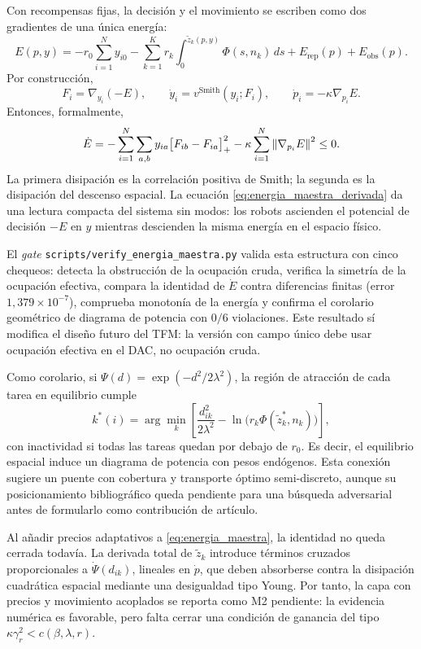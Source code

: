 Con recompensas fijas, la decisión y el movimiento se escriben como dos gradientes de
una única energía:
\begin{equation}
  E(p,y)=
  -r_0\sum_{i=1}^{N}y_{i0}
  -\sum_{k=1}^{K} r_k\int_{0}^{\tilde z_k(p,y)}\Phi(s,n_k)\,ds
  +E_{\mathrm{rep}}(p)+E_{\mathrm{obs}}(p).
  \label{eq:energia_maestra}
\end{equation}
Por construcción,
\[
  F_i=\nabla_{y_i}(-E),\qquad
  \dot y_i=v^{\mathrm{Smith}}(y_i;F_i),\qquad
  \dot p_i=-\kappa\nabla_{p_i}E .
\]
Entonces, formalmente,
\begin{equation}
  \dot E =
  -\sum_{i=1}^{N}\sum_{a,b} y_{ia}
  \bigl[F_{ib}-F_{ia}\bigr]_{+}^{2}
  -\kappa\sum_{i=1}^{N}\left\|\nabla_{p_i}E\right\|^{2}
  \le 0 .
  \label{eq:energia_maestra_derivada}
\end{equation}
La primera disipación es la correlación positiva de Smith; la segunda es la disipación
del descenso espacial. La ecuación \eqref{eq:energia_maestra_derivada} da una lectura
compacta del sistema sin modos: los robots ascienden el potencial de decisión
$-E$ en $y$ mientras descienden la misma energía en el espacio físico.

El \emph{gate} \texttt{scripts/verify\_energia\_maestra.py} valida esta estructura con
cinco chequeos: detecta la obstrucción de la ocupación cruda, verifica la simetría de la
ocupación efectiva, compara la identidad de $\dot E$ contra diferencias finitas
(error $1{,}379\times10^{-7}$), comprueba monotonía de la energía y confirma el
corolario geométrico de diagrama de potencia con $0/6$ violaciones. Este resultado sí
modifica el diseño futuro del TFM: la versión con campo único debe usar ocupación
efectiva en el DAC, no ocupación cruda.

Como corolario, si $\Psi(d)=\exp(-d^2/2\lambda^2)$, la región de atracción de cada tarea
en equilibrio cumple
\begin{equation}
  k^*(i)=
  \arg\min_k
  \left[
    \frac{d_{ik}^{2}}{2\lambda^{2}}
    -\ln\!\bigl(r_k\Phi(\tilde z_k^*,n_k)\bigr)
  \right],
  \label{eq:diagrama_potencia}
\end{equation}
con inactividad si todas las tareas quedan por debajo de $r_0$. Es decir, el equilibrio
espacial induce un diagrama de potencia con pesos endógenos. Esta conexión sugiere un
puente con cobertura y transporte óptimo semi-discreto, aunque su posicionamiento
bibliográfico queda pendiente para una búsqueda adversarial antes de formularlo como
contribución de artículo.

Al añadir precios adaptativos a \eqref{eq:energia_maestra}, la identidad no queda
cerrada todavía. La derivada total de $\tilde z_k$ introduce términos cruzados
proporcionales a $\dot\Psi(d_{ik})$, lineales en $\dot p$, que deben absorberse contra
la disipación cuadrática espacial mediante una desigualdad tipo Young. Por tanto, la
capa con precios y movimiento acoplados se reporta como M2 pendiente: la evidencia
numérica es favorable, pero falta cerrar una condición de ganancia del tipo
$\kappa\gamma_r^2<c(\beta,\lambda,r)$.

